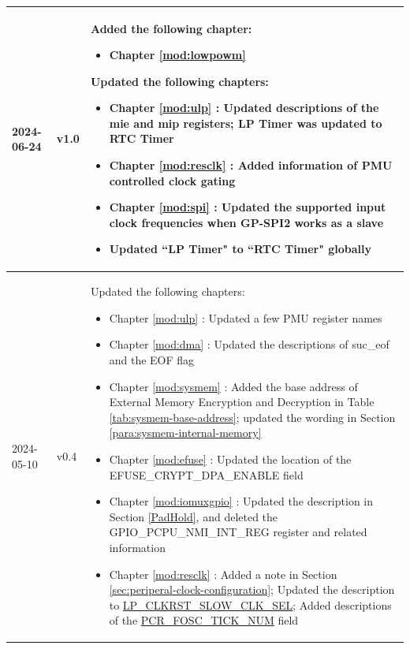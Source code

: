 \begin{longtable}[l]{ | m{2cm} | m{1.5cm} | m{12cm} | }
    2024-06-24        & v1.0 &
    Added the following chapter:
    \begin{itemize}
        \item Chapter \ref{mod:lowpowm} \nameref{mod:lowpowm}
    \end{itemize}
    Updated the following chapters:
    \begin{itemize}
        \item Chapter \ref{mod:ulp} \textit{\nameref{mod:ulp}}: Updated descriptions of the mie and mip registers; LP Timer was updated to RTC Timer %
        \item Chapter \ref{mod:resclk} \textit{\nameref{mod:resclk}}: Added information of PMU controlled clock gating %
        \item Chapter \ref{mod:spi} \textit{\nameref{mod:spi}}: Updated the supported input clock frequencies when GP-SPI2 works as a slave %
        \item Updated ``LP Timer" to ``RTC Timer" globally %
    \end{itemize}
    \\\hline
    2024-05-10          & v0.4 &
    Updated the following chapters:
    \begin{itemize}
        \item Chapter \ref{mod:ulp} \textit{\nameref{mod:ulp}}: Updated a few PMU register names %
        \item Chapter \ref{mod:dma} \textit{\nameref{mod:dma}}: Updated the descriptions of suc\_eof and the EOF flag %
        \item Chapter \ref{mod:sysmem} \textit{\nameref{mod:sysmem}}: Added the base address of External Memory Encryption and Decryption in Table \ref{tab:sysmem-base-address}; updated the wording in Section \ref{para:sysmem-internal-memory} %
        \item Chapter \ref{mod:efuse} \textit{\nameref{mod:efuse}}: Updated the location of the EFUSE\_CRYPT\_DPA\_ENABLE field %
        \item Chapter \ref{mod:iomuxgpio} \textit{\nameref{mod:iomuxgpio}}: Updated the description in Section \ref{PadHold}, and deleted the GPIO\_PCPU\_NMI\_INT\_REG register and related information %
        \item Chapter \ref{mod:resclk} \textit{\nameref{mod:resclk}}: Added a note in Section \ref{sec:periperal-clock-configuration}; Updated the description to \hyperlink{fielddesc:LPCLKRSTSLOWCLKSEL}{LP\_CLKRST\_SLOW\_CLK\_SEL}; Added descriptions of the \hyperref[fielddesc:PCRFOSCTICKNUM]{PCR\_FOSC\_TICK\_NUM} field %

\end{itemize}
\end{longtable}
